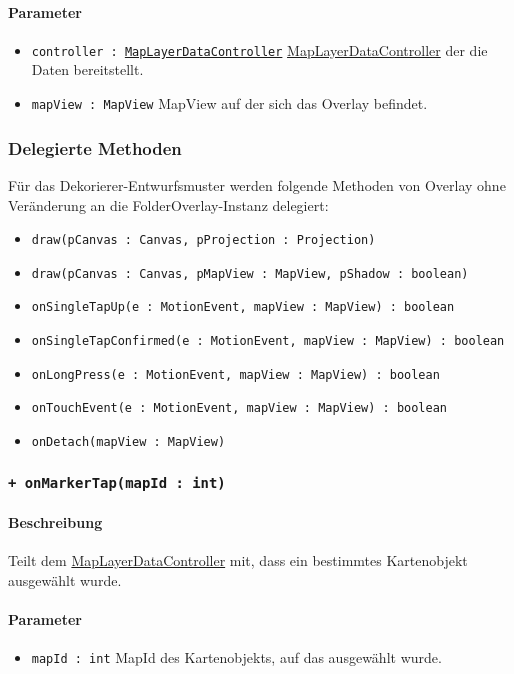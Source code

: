 \paragraph*{Parameter}
\begin{itemize}
    \item \texttt{controller : \hyperref[App_Map_ViewModel_MapLayerDataController]{MapLayerDataController}} \hyperref[App_Map_ViewModel_MapLayerDataController]{MapLayerDataController} der die Daten bereitstellt.
    \item \texttt{mapView : MapView} MapView auf der sich das Overlay befindet.
\end{itemize}

\subsubsection*{Delegierte Methoden}
Für das Dekorierer-Entwurfsmuster werden folgende Methoden von Overlay ohne Veränderung 
an die FolderOverlay-Instanz delegiert:
\begin{itemize}
    \item \texttt{draw(pCanvas : Canvas, pProjection : Projection)}
    \item \texttt{draw(pCanvas : Canvas, pMapView : MapView, pShadow : boolean)}
    \item \texttt{onSingleTapUp(e : MotionEvent, mapView : MapView) : boolean}
    \item \texttt{onSingleTapConfirmed(e : MotionEvent, mapView : MapView) : boolean}
    \item \texttt{onLongPress(e : MotionEvent, mapView : MapView) : boolean}
    \item \texttt{onTouchEvent(e : MotionEvent, mapView : MapView) : boolean}
    \item \texttt{onDetach(mapView : MapView)}
\end{itemize}

\subsubsection*{\texttt{+ onMarkerTap(mapId : int)}}%
\paragraph*{Beschreibung}
Teilt dem \hyperref[App_Map_ViewModel_MapLayerDataController]{MapLayerDataController} mit, dass ein bestimmtes Kartenobjekt ausgewählt wurde.
\paragraph*{Parameter}
\begin{itemize}
    \item \texttt{mapId : int} MapId des Kartenobjekts, auf das ausgewählt wurde.
\end{itemize}
